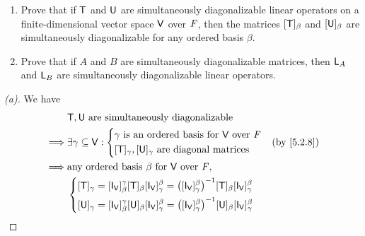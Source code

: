 \begin{ex}\label{ex:5.2.17}
  \begin{enumerate}
    \item Prove that if \(\mathsf{T}\) and \(\mathsf{U}\) are simultaneously diagonalizable linear operators on a finite-dimensional vector space \(\mathsf{V}\) over \(\mathit{F}\), then the matrices \([\mathsf{T}]_{\beta}\) and \([\mathsf{U}]_{\beta}\) are simultaneously diagonalizable for any ordered basis \(\beta\).
    \item Prove that if \(A\) and \(B\) are simultaneously diagonalizable matrices, then \(\mathsf{L}_A\) and \(\mathsf{L}_B\) are simultaneously diagonalizable linear operators.
  \end{enumerate}
\end{ex}

\begin{proof}[(a)]
  We have
  \begin{align*}
             & \T, \U \text{ are simultaneously diagonalizable}                                                                                                                                                                                                  \\
    \implies & \exists \gamma \subseteq \V : \begin{dcases}
                                               \gamma \text{ is an ordered basis for } \V \text{ over } \F \\
                                               [\T]_{\gamma}, [\U]_{\gamma} \text{ are diagonal matrices}
                                             \end{dcases}                                                                                                                                                                    &  & \by{5.2.8}                     \\
    \implies & \text{any ordered basis } \beta \text{ for } \V \text{ over } \F,                                                                                                                                                                                 \\
             & \begin{dcases}
                 [\T]_{\gamma} = [\IT[\V]]_{\beta}^{\gamma} [\T]_{\beta} [\IT[\V]]_{\gamma}^{\beta} = \pa{[\IT[\V]]_{\gamma}^{\beta}}^{-1} [\T]_{\beta} [\IT[\V]]_{\gamma}^{\beta} \\
                 [\U]_{\gamma} = [\IT[\V]]_{\beta}^{\gamma} [\U]_{\beta} [\IT[\V]]_{\gamma}^{\beta} = \pa{[\IT[\V]]_{\gamma}^{\beta}}^{-1} [\U]_{\beta} [\IT[\V]]_{\gamma}^{\beta}

\end{dcases}
\end{align*}
\end{proof}
